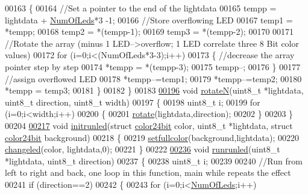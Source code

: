 \begin{DoxyCode}
00163     \{
00164         \textcolor{comment}{//Set a pointer to the end of the lightdata}
00165         tempp = lightdata + \hyperlink{globals_8h_ad5db4045aed262ed4aae2af9d81fab98}{NumOfLeds}*3 -1;
00166         \textcolor{comment}{//Store overflowing LED}
00167         temp1 = *tempp;
00168         temp2 = *(tempp-1);
00169         temp3 = *(tempp-2);
00170         
00171         \textcolor{comment}{//Rotate the array (minus 1 LED-->overflow; 1 LED correlate three 8 Bit color values)}
00172         \textcolor{keywordflow}{for} (i=0;i<(NumOfLeds*3-3);i++)
00173         \{   \textcolor{comment}{//decrease the array pointer step by step}
00174             *tempp = *(tempp-3);    
00175             tempp--;    
00176         \}
00177         \textcolor{comment}{//assign overflowed LED}
00178         *tempp--=temp1;
00179         *tempp--=temp2;
00180         *tempp = temp3;     
00181     \}
00182 \}
00183 
\hypertarget{_led_effects_8c_source_l00196}{}\hyperlink{_led_effects_8h_a1fa5e03cb24195a46dcdc5948f596181}{00196} \textcolor{keywordtype}{void} \hyperlink{_led_effects_8c_a1fa5e03cb24195a46dcdc5948f596181}{rotateN}(uint8\_t *lightdata, uint8\_t direction, uint8\_t width)
00197 \{
00198     uint8\_t i;
00199     \textcolor{keywordflow}{for} (i=0;i<width;i++)
00200     \{
00201         \hyperlink{_led_effects_8c_afd64325b08e785d37b4dfaf358e517f0}{rotate}(lightdata,direction);
00202     \}
00203 \}
00204 
\hypertarget{_led_effects_8c_source_l00217}{}\hyperlink{_led_effects_8h_aecba07ab559ab94e6f44c16e39012d80}{00217} \textcolor{keywordtype}{void} \hyperlink{_led_effects_8c_aecba07ab559ab94e6f44c16e39012d80}{initrunled}(\textcolor{keyword}{struct} \hyperlink{structcolor24bit}{color24bit} color, uint8\_t *lightdata, \textcolor{keyword}{struct} 
      \hyperlink{structcolor24bit}{color24bit} background)
00218 \{
00219     \hyperlink{_led_effects_8c_a2d54d1a6c61fe667b7c68ff04a11c503}{setfullcolor}(background,lightdata);
00220     \hyperlink{_lightstribe_8c_a63fa595d401f0e85c1bba55ba2b1d66e}{changeled}(color, lightdata,0);
00221 \}
00222 
\hypertarget{_led_effects_8c_source_l00236}{}\hyperlink{_led_effects_8h_a35cfbfc36c975f98a7779a37b6ff63ce}{00236} \textcolor{keywordtype}{void} \hyperlink{_led_effects_8c_a35cfbfc36c975f98a7779a37b6ff63ce}{runrunled}(uint8\_t *lightdata, uint8\_t direction)
00237 \{
00238     uint8\_t i;
00239     
00240     \textcolor{comment}{//Run from left to right and back, one loop in this function, main while repeats the effect}
00241     \textcolor{keywordflow}{if} (direction==2)
00242     \{
00243         \textcolor{keywordflow}{for} (i=0;i<\hyperlink{globals_8h_ad5db4045aed262ed4aae2af9d81fab98}{NumOfLeds};i++)

\end{DoxyCode}

